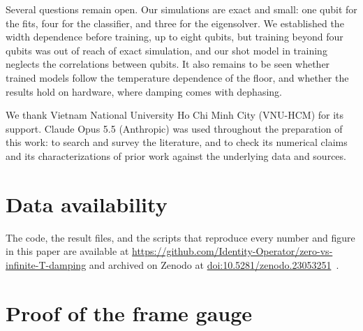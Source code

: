 \documentclass[
 aps,pra,
 twocolumn,
 superscriptaddress,
 longbibliography,
 nofootinbib
]{revtex4-2}
\begin{document}
Several questions remain open. Our simulations are exact and small: one qubit
for the fits, four for the classifier, and three for the eigensolver. We
established the width dependence before training, up to eight qubits, but
training beyond four qubits was out of reach of exact simulation, and our shot
model in training neglects the correlations between qubits. It also remains
to be seen whether trained models follow the temperature dependence of the
floor, and whether the results hold on hardware, where damping comes with
dephasing.

\begin{acknowledgments}

We thank Vietnam National University Ho Chi Minh City (VNU-HCM) for its support.
Claude Opus 5.5 (Anthropic) was used throughout the preparation of this work: to
search and survey the literature, and to
check its numerical claims and its characterizations of prior work against the
underlying data and sources.

\end{acknowledgments}

\section*{Data availability}
The code, the result files, and the scripts that reproduce every number and
figure in this paper are available at
\url{https://github.com/Identity-Operator/zero-vs-infinite-T-damping} and archived
on Zenodo at \href{https://doi.org/10.5281/zenodo.23053251}{doi:10.5281/zenodo.23053251}~\cite{nguyen2026zenodo}.

\appendix

\section{Proof of the frame gauge}
\label{app:gauge}
\end{document}
